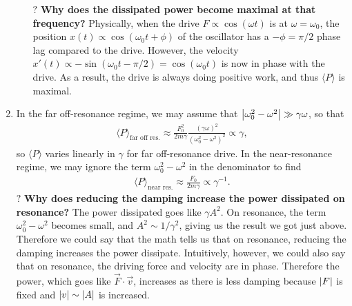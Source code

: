 \documentclass{article}
\theoremstyle{definition}
\newcommand{\f}[2]{\frac{#1}{#2}}
\begin{document}
\begin{enumerate}[label= \alph*)]
\begin{enumerate}[label=\roman*)]
	
	
	
	$\boxed{\textbf{?}}$ \textbf{Why does the dissipated power become maximal at that frequency? } Physically, when the drive $F \propto \cos (\omega t)$ is at $\omega = \omega_0$, the position $x(t) \propto \cos(\omega_0 t + \phi)$ of the oscillator has a $-\phi =\pi/2$ phase lag compared to the drive. However, the velocity $x'(t) \propto -\sin(\omega_0 t -\pi/2) = \cos(\omega_0 t)$ is now in phase with the drive. As a result, the drive is always doing positive work, and thus $\langle P \rangle$ is maximal.  
	
	
	\end{enumerate}
	
	\item In the far off-resonance regime, we may assume that $\abs{\omega_0^2 - \omega^2}\gg \gamma \omega$, so that 
	\begin{align*}
	\langle P \rangle_\text{far off res.}  \approx   \f{F_0^2}{2m\gamma} \f{(\gamma \omega)^2}{(\omega_0^2 - \omega^2)^2} \propto \gamma,
	\end{align*}
	so $\langle P \rangle$ varies linearly in $\gamma$ for far off-resonance drive. In the near-resonance regime, we may ignore the term $\omega_0^2 - \omega^2$ in the denominator to find 
	\begin{align*}
	\langle P \rangle_\text{near res.} \approx \f{F_0}{2m\gamma} \propto \gamma^{-1}.
	\end{align*}
	$\boxed{\textbf{?}}$ \textbf{Why does reducing the damping increase the power dissipated on resonance?} The power dissipated goes like $\gamma A^2$. On resonance, the term $\omega_0^2 - \omega^2$ becomes small, and $A^2\sim 1/\gamma^2$, giving us the result we got just above. Therefore we could say that the math tells us that on resonance, reducing the damping increases the power dissipate. Intuitively, however, we could also say that on resonance, the driving force and velocity are in phase. Therefore the power, which goes like $\vec{F} \cdot \vec{v}$, increases as there is less damping  because $\abs{F}$ is fixed and $\abs{v}\sim \abs{A}$ is increased. 	 
	
	
	

\end{enumerate}
\end{document}
